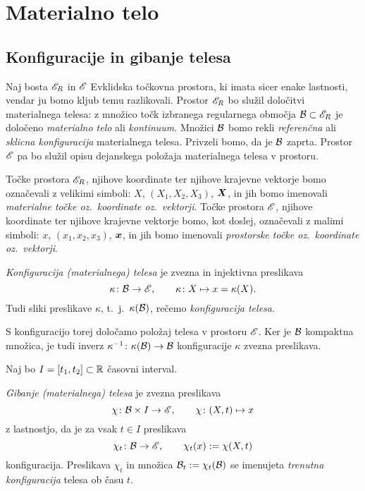 \chapter{Materialno telo} \label{chp:kinkon}


\section{Konfiguracije in gibanje telesa}


Naj bosta $\mathscr E_R$ in $\mathscr E$ Evklidska točkovna prostora, ki imata sicer enake lastnosti,
vendar ju bomo kljub temu razlikovali. Prostor $\mathscr E_R$ bo služil določitvi materialnega
telesa: z množico točk izbranega regularnega območja $\mathcal B\subset\mathscr E_R$ je določeno \emph{materialno
telo} ali \emph{kontinuum}. Množici $\mathcal B$ bomo rekli \emph{referenčna} ali \emph{sklicna konfiguracija}
materialnega telesa. Privzeli bomo, da je $\mathcal B$ zaprta.
Prostor $\mathscr E$ pa bo služil opisu dejanskega položaja materialnega telesa v prostoru.

Točke prostora $\mathscr E_R$, njihove koordinate ter njihove krajevne vektorje bomo označevali
z velikimi simboli: $X$, $(X_1,X_2,X_3)$, $\boldsymbol X$, in jih bomo imenovali
\emph{materialne točke oz.~koordinate oz.~vektorji}.
Točke prostora $\mathscr E$, njihove koordinate ter njihove krajevne vektorje bomo,
kot doslej, označevali z malimi simboli: $x$, $(x_1,x_2,x_3)$, $\boldsymbol x$, in jih bomo imenovali
\emph{prostorske točke oz.~koordinate oz.~vektorji}.

\begin{definicija}
	\emph{Konfiguracija (materialnega) telesa} je zvezna in injektivna preslikava
	\[ \kappa\colon \mathcal B\to\mathscr E,\qquad \kappa\colon X\mapsto x=\kappa(X). \]
	Tudi sliki preslikave $\kappa$, t.~j.~$\kappa(\mathcal B)$, rečemo \emph{konfiguracija telesa}.
\end{definicija}
S konfiguracijo torej določamo položaj telesa v prostoru $\mathscr E$. Ker je $\mathcal B$ kompaktna
množica, je tudi inverz $\kappa^{-1}\colon\kappa(\mathcal B)\to\mathcal B$ konfiguracije $\kappa$ zvezna preslikava.

Naj bo $I=[t_1,t_2]\subset\mathbb R$ časovni interval.
\begin{definicija}
	\emph{Gibanje (materialnega) telesa} je zvezna preslikava
	\begin{equation}\label{e:chi}
		\chi\colon\mathcal B\times I\to\mathscr E,\qquad \chi\colon(X,t)\mapsto x
	\end{equation}
	z lastnostjo, da je za vsak $t\in I$ preslikava
	\[ \chi_t\colon\mathcal B\to\mathscr E,\qquad \chi_t(x):=\chi(X,t) \]
	konfiguracija. Preslikava $\chi_t$ in množica $\mathcal B_t:=\chi_t(\mathcal B)$ se imenujeta
	\emph{trenutna konfiguracija} telesa ob času $t$.
\end{definicija}

